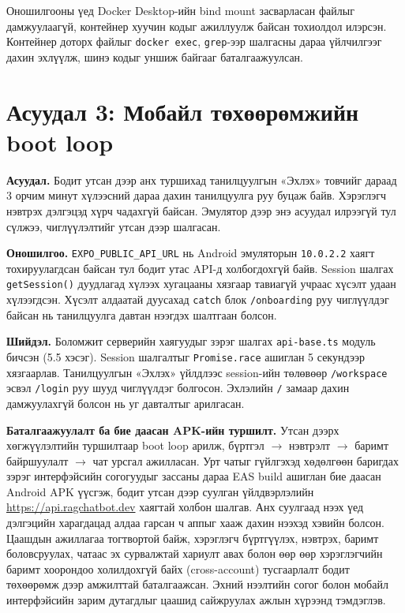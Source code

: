 \documentclass[../main.tex]{subfiles}
\begin{document}
Оношилгооны үед Docker Desktop-ийн bind mount засварласан файлыг
дамжуулаагүй, контейнер хуучин кодыг ажиллуулж байсан тохиолдол илэрсэн.
Контейнер доторх файлыг \texttt{docker exec}, \texttt{grep}-ээр шалгасны
дараа үйлчилгээг дахин эхлүүлж, шинэ кодыг уншиж байгааг баталгаажуулсан.

\section{Асуудал 3: Мобайл төхөөрөмжийн boot loop}
\label{sec:problem-bootloop}

\textbf{Асуудал.} Бодит утсан дээр анх туршихад танилцуулгын «Эхлэх»
товчийг дараад 3 орчим минут хүлээсний дараа дахин танилцуулга руу
буцаж байв. Хэрэглэгч нэвтрэх дэлгэцэд хүрч чадахгүй байсан. Эмулятор
дээр энэ асуудал илрээгүй тул сүлжээ, чиглүүлэлтийг утсан дээр шалгасан.

\textbf{Оношилгоо.} \texttt{EXPO\_PUBLIC\_API\_URL} нь Android
эмуляторын \texttt{10.0.2.2} хаягт тохируулагдсан байсан тул бодит утас
API-д холбогдохгүй байв. Session шалгах \texttt{getSession()} дуудлагад
хүлээх хугацааны хязгаар тавиагүй учраас хүсэлт удаан хүлээгдсэн.
Хүсэлт алдаатай дуусахад \texttt{catch} блок \texttt{/onboarding} руу
чиглүүлдэг байсан нь танилцуулга давтан нээгдэх шалтгаан болсон.

\textbf{Шийдэл.} Боломжит серверийн хаягуудыг зэрэг шалгах
\texttt{api-base.ts} модуль бичсэн (5.5 хэсэг). Session шалгалтыг
\texttt{Promise.race} ашиглан 5 секундээр хязгаарлав. Танилцуулгын
«Эхлэх» үйлдлээс session-ийн төлөвөөр \texttt{/workspace} эсвэл
\texttt{/login} руу шууд чиглүүлдэг болгосон. Эхлэлийн \texttt{/} замаар
дахин дамжуулахгүй болсон нь уг давталтыг арилгасан.

\textbf{Баталгаажуулалт ба бие даасан APK-ийн туршилт.} Утсан дээрх
хөгжүүлэлтийн туршилтаар boot loop арилж, бүртгэл $\rightarrow$ нэвтрэлт
$\rightarrow$ баримт байршуулалт $\rightarrow$ чат урсгал ажилласан.
Урт чатыг гүйлгэхэд хөдөлгөөн баригдах зэрэг интерфэйсийн согогуудыг
зассаны дараа EAS build ашиглан бие даасан Android APK үүсгэж, бодит утсан дээр
суулган үйлдвэрлэлийн \url{https://api.ragchatbot.dev} хаягтай холбон
шалгав. Анх суулгаад нээх үед дэлгэцийн харагдацад алдаа гарсан ч аппыг
хааж дахин нээхэд хэвийн болсон. Цаашдын ажиллагаа тогтвортой байж, хэрэглэгч
бүртгүүлэх, нэвтрэх, баримт боловсруулах, чатаас эх сурвалжтай хариулт авах
болон өөр өөр хэрэглэгчийн баримт хоорондоо холилдохгүй байх (cross-account)
тусгаарлалт бодит төхөөрөмж дээр амжилттай баталгаажсан. Эхний нээлтийн согог
болон мобайл интерфэйсийн зарим дутагдлыг цаашид сайжруулах ажлын хүрээнд
тэмдэглэв.
\end{document}
